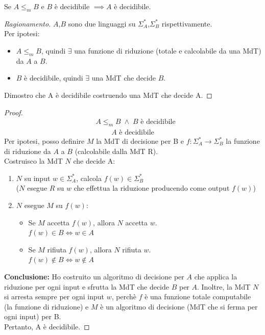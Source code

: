 \documentclass{article}  %
\theoremstyle{definition}
\newenvironment{ragionamento}[1][]
  {\begin{proof}[Ragionamento#1]\renewcommand{\qedsymbol}{}\normalfont}
  {\end{proof}}
\begin{document}
\begin{esercizio}[Dimostrazione 3.1]
	\footnotesize %
	Se $A \leq_m B$ e $B$ è decidibile $\implies A$ è decidibile.
	\begin{ragionamento}
		$A$,$B$ sono due linguaggi su $\Sigma^*_A$,$\Sigma^*_B$ rispettivamente. \\
		Per ipotesi:
		\begin{itemize}
			\item $A \leq_m B$, quindi $\exists$ una funzione di riduzione (totale e calcolabile da una MdT) da $A$ a $B$.
			\item $B$ è decidibile, quindi $\exists$ una MdT che decide $B$.
		\end{itemize}
		Dimostro che A è decidibile costruendo una MdT che decide A.
	\end{ragionamento}
	\begin{proof}
		\begin{align*}
			 & A \leq_m B \;\wedge\; B \text{ è decidibile} \tag*{(ipotesi)}
		\end{align*}
		\begin{align*}
			A \text{ è decidibile} \tag*{(tesi)}
		\end{align*}
		Per ipotesi, posso definire $M$ la MdT di decisione per B e $f:\Sigma^*_A \rightarrow \Sigma^*_B$ la funzione di riduzione da $A$ a $B$ (calcolabile dalla MdT R). \\
		Costruisco la MdT $N$ che decide A:
		\begin{enumerate}
			\item $N$ su input $w \in \Sigma^*_A$, calcola $f(w) \in \Sigma^*_B$ \\
			      ($N$ esegue $R$ su $w$ che effettua la riduzione producendo come output $f(w)$)
			\item $N$ esegue $M$ su $f(w)$:
			      \begin{itemize}
				      \item Se $M$ accetta $f(w)$, allora $N$ accetta $w$. \\
				            $f(w) \in B \iff w \in A$
				      \item Se $M$ rifiuta $f(w)$, allora $N$ rifiuta $w$.  \\
				            $f(w) \notin B \iff w \notin A$
			      \end{itemize}
		\end{enumerate}
		\textbf{{Conclusione:}} Ho costruito un algoritmo di decisione per $A$ che applica la riduzione per ogni input e sfrutta la MdT che
		decide $B$ per $A$. Inoltre, la MdT $N$ si arresta sempre per ogni input $w$, perchè $f$ è una funzione totale computabile
		(la funzione di riduzione) e $M$ è un algoritmo di decisione (MdT che si ferma per ogni input) per B.\\
		Pertanto, A è decidibile.


\end{proof}
\end{esercizio}
\end{document}
